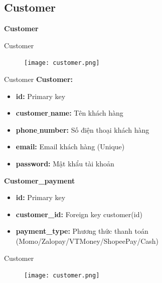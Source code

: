 \documentclass[aspectratio=43,xcolor=dvipsnames]{beamer}
\begin{document}
	\subsection{Customer}
	\begin{frame}
		\textcolor{structure}{\Huge{\textbf{Customer}}}
	\end{frame}
	\begin{frame}{Customer}
		\begin{figure}[ht!]
			\centerline{\texttt{[image: customer.png]}}
			\label{fig:ass1}
		\end{figure}
	\end{frame}
	\begin{frame}{Customer}
		\textcolor{structure}{\large{\textbf{Customer:}}}
		\begin{itemize}
			\item \textbf{id:} Primary key
			\item \textbf{customer$\_$name:} Tên khách hàng
			\item \textbf{phone$\_$number:} Số điện thoại khách hàng
			\item \textbf{email:} Email khách hàng (Unique)
			\item \textbf{password:} Mật khẩu tài khoản
		\end{itemize}
		\pause
		\textcolor{structure}{\large{\textbf{Customer\_payment}}}
		\begin{itemize}
			\item \textbf{id:} Primary key
			\item \textbf{customer\_id:} Foreign key customer(id)
			\item \textbf{payment\_type:} Phương thức thanh toán (Momo/Zalopay/VTMoney/ShopeePay/Cash)
		\end{itemize}
	\end{frame}
	\begin{frame}{Customer}
		\begin{figure}[ht!]
			\centerline{\texttt{[image: customer.png]}}
			\label{fig:ass1}
		\end{figure}
	\end{frame}
\end{document}
